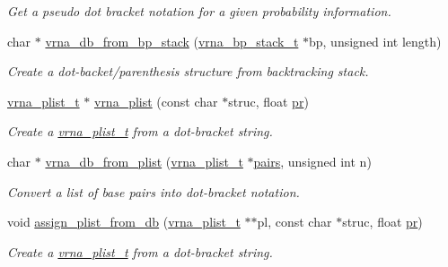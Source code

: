 \begin{DoxyCompactItemize}
\begin{DoxyCompactList}\small\item\em Get a pseudo dot bracket notation for a given probability information. \end{DoxyCompactList}\item 
char $\ast$ \hyperlink{group__struct__utils_ga27bea2c241564af53a065982183389df}{vrna\-\_\-db\-\_\-from\-\_\-bp\-\_\-stack} (\hyperlink{group__data__structures_gaa651bda42e7692f08cb603cd6834b0ee}{vrna\-\_\-bp\-\_\-stack\-\_\-t} $\ast$bp, unsigned int length)
\begin{DoxyCompactList}\small\item\em Create a dot-\/backet/parenthesis structure from backtracking stack. \end{DoxyCompactList}\item 
\hyperlink{group__data__structures_ga8e4eb5e1bfc95776559575beb359af87}{vrna\-\_\-plist\-\_\-t} $\ast$ \hyperlink{group__struct__utils_gad4448f5d2c2da0e4ab1731a3586b2542}{vrna\-\_\-plist} (const char $\ast$struc, float \hyperlink{fold__vars_8h_ac98ec419070aee6831b44e5c700f090f}{pr})
\begin{DoxyCompactList}\small\item\em Create a \hyperlink{group__data__structures_ga8e4eb5e1bfc95776559575beb359af87}{vrna\-\_\-plist\-\_\-t} from a dot-\/bracket string. \end{DoxyCompactList}\item 
char $\ast$ \hyperlink{group__struct__utils_gab6a7a36c90836880f7ab09b9f6baf1af}{vrna\-\_\-db\-\_\-from\-\_\-plist} (\hyperlink{group__data__structures_ga8e4eb5e1bfc95776559575beb359af87}{vrna\-\_\-plist\-\_\-t} $\ast$\hyperlink{group__struct__utils_ga6341cbb704924824e0236c1dce791032}{pairs}, unsigned int n)
\begin{DoxyCompactList}\small\item\em Convert a list of base pairs into dot-\/bracket notation. \end{DoxyCompactList}\item 
void \hyperlink{group__struct__utils_ga6f3031d77de925a7b4ca72e1d52dec2f}{assign\-\_\-plist\-\_\-from\-\_\-db} (\hyperlink{group__data__structures_ga8e4eb5e1bfc95776559575beb359af87}{vrna\-\_\-plist\-\_\-t} $\ast$$\ast$pl, const char $\ast$struc, float \hyperlink{fold__vars_8h_ac98ec419070aee6831b44e5c700f090f}{pr})
\begin{DoxyCompactList}\small\item\em Create a \hyperlink{group__data__structures_ga8e4eb5e1bfc95776559575beb359af87}{vrna\-\_\-plist\-\_\-t} from a dot-\/bracket string. \end{DoxyCompactList}\item 
$$
\end{DoxyCompactItemize}
